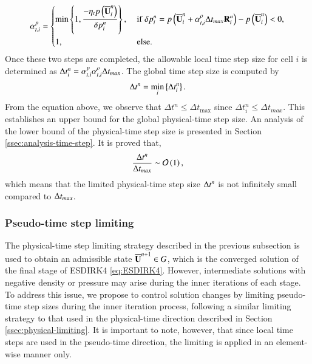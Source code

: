 \begin{equation}
\label{eq:alpha-t-p}
    \alpha_{t,i}^{p} = \begin{dcases}
        \min\left\{1, \dfrac{-\eta_t p \left(\UM^n_i\right)}{\delta p_i^n} \right\}, & \ 
        \mathrm{if} \ \delta p_i^n=  p \left(\UM^n_i + \alpha_{t,i}^{\rho} \inc t_{max} \R^n_i\right) -  p \left(\UM^n_i\right) <0, \\
        1, & \ \mathrm{else}.
    \end{dcases}
\end{equation}
Once these two steps are completed, the allowable local time step size for cell $i$ is determined as $\Delta t^n_i= \alpha_{t,i}^{p}  \alpha_{t,i}^{\rho} \mathrm\Delta t_{max}$.
The global time step size is computed by
\begin{equation}
    \label{eq:alpha-t-global}
    \mathrm\Delta t^n = \min_i \left\{\Delta t^n_i \right\}.
\end{equation}
From the equation above, we observe that $\Delta t^n \leq \Delta t_{\text{max}}$ since $\Delta t^n_i \leq \Delta t_{max}$. This establishes an upper bound for the global physical-time step size.
An analysis of the lower bound of the physical-time step size is presented in Section \ref{ssec:analysis-time-step}. It is proved that, 
\begin{equation}
    \dfrac{\mathrm\Delta t^n}{\mathrm\Delta t_{max}} \sim \mathcal{O} \left(1\right),
\end{equation}
which means that the limited physical-time step size $\mathrm\Delta t^n$ is not infinitely small compared to $\mathrm\Delta t_{max}$.


\subsubsection{Pseudo-time step limiting}
\label{ssec:pseudo-limiting}

The physical-time step limiting strategy described in the previous subsection is used to obtain an admissible state $\overline{\mathbf{U}}^{n+1} \in G$, which is the converged solution of the final stage of ESDIRK4 \eqref{eq:ESDIRK4}. However, intermediate solutions with negative density or pressure may arise during the inner iterations of each stage. To address this issue, we propose to control solution changes by limiting pseudo-time step sizes during the inner iteration process, following a similar limiting strategy to that used in the physical-time direction described in Section \ref{ssec:physical-limiting}. It is important to note, however, that since local time steps are used in the pseudo-time direction, the limiting is applied in an element-wise manner only.

